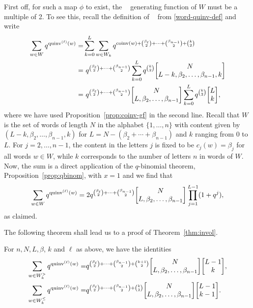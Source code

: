 \documentclass[ALCO,Unicode]{cedram}
\DeclareMathOperator{\coinv}{coinv}
\DeclareMathOperator{\quinvL}{\quinv^{(\ell)}}
\DeclareMathOperator{\quinv}{quinv}
\newcommand{\qbinom}[2]{\bgroup\renewcommand*{\arraystretch}{1}\begin{bmatrix} #1 \\ #2\end{bmatrix} \egroup}
\begin{document}
First off, for such a map $\phi$ to exist, the $\quinvL$ generating function of $W$ must be a multiple
of 2. To see this, recall the definition of $\quinvL$ from \eqref{word-quinv-def} and write
\begin{align*}
\sum_{w \in W} q^{\quinvL(w)} =& \sum_{k=0}^L \sum_{w \in W_k} q^{\coinv(w) + \binom{\beta_\ell}{2} + \cdots + \binom{\beta_{n-1}}{2} + \binom{k}{2} } \\
=&\ q^{\binom{\beta_\ell}{2} + \cdots + \binom{\beta_{n-1}}{2}} \sum_{k=0}^L q^{\binom{k}{2}} \qbinom N{L-k,\beta_2,\dots, \beta_{n-1},k} \\
=&\ q^{\binom{\beta_\ell}{2} + \cdots + \binom{\beta_{n-1}}{2}} \qbinom{N}{L,\beta_2,\dots,\beta_{n-1}} \sum_{k=0}^L q^{\binom{k}{2}} \qbinom Lk,
\end{align*}
where we have used Proposition~\ref{prop:coinv-gf} in the second line. Recall that $W$ is the set of words of length $N$ in the alphabet $\{1,\ldots,n\}$ with content given by $(L-k,\beta_2,\ldots,\beta_{n-1},k)$ for $L=N-(\beta_2+\cdots+\beta_{n-1})$ and $k$ ranging from $0$ to $L$. For $j=2,\ldots,n-1$, the content in the letters $j$ is fixed to be $c_j(w)=\beta_j$ for all words $w\in W$, while $k$ corresponds to the number of letters $n$ in words of $W$. Now, the sum is a direct application 
of the $q$-binomial theorem, Proposition~\ref{prop:qbinom}, with $x=1$ and we find that
\[
\sum_{w \in W} q^{\quinvL(w)} = 2 q^{\binom{\beta_\ell}{2} + \cdots + \binom{\beta_{n-1}}{2}}  \qbinom{N}{L,\beta_2,\dots,\beta_{n-1}} \prod_{j=1}^{L-1} (1 + q^j),
\]
as claimed.

The following theorem shall lead us to a proof of Theorem~\ref{thm:invol}.

\begin{theorem}
\label{thm:quinv-gf}
For $n, N, L, \beta$, $k$ and $\ell$ as above, we have the identities
\begin{align}
\label{quinv-gf>}
\sum_{w \in W_k^>} q^{\quinvL(w)} =& q^{\binom{\beta_\ell}{2} + \cdots + \binom{\beta_{n-1}}{2} + \binom{k+1}{2}} \qbinom{N}{L,\beta_2,\dots,\beta_{n-1}} \qbinom{L-1}{k}, \\
\label{quinv-gf<}
\sum_{w \in W_k^\leq} q^{\quinvL(w)} =& q^{\binom{\beta_\ell}{2} + \cdots + \binom{\beta_{n-1}}{2} + \binom{k}{2}} \qbinom{N}{L,\beta_2,\dots,\beta_{n-1}} \qbinom{L-1}{k-1}.
\end{align}
\end{theorem}
\end{document}
